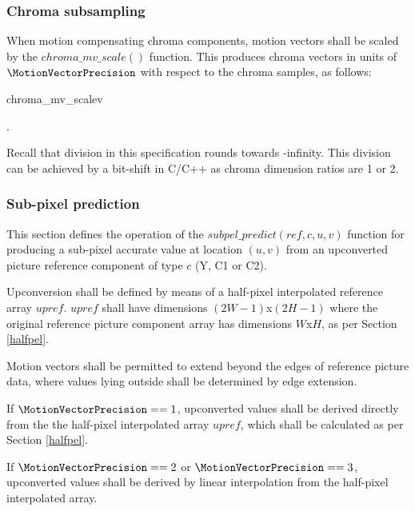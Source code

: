 \subsubsection{Chroma subsampling}
\label{chromamvscale}

When motion compensating chroma components, motion vectors shall be scaled by the
$chroma\_mv\_scale()$ function. This produces chroma vectors in units of 
$\MotionVectorPrecision$ with respect to the chroma samples, as follows:

\begin{pseudo}{chroma\_mv\_scale}{v}
\end{pseudo}.

\begin{informative}
Recall that division in this specification rounds towards -infinity. This division can be achieved by a bit-shift in C/C++ as chroma dimension ratios are 1 or 2.
\end{informative}


\subsubsection{Sub-pixel prediction}
\label{upconvert}

This section defines the operation of the $subpel\_predict(ref, c, u, v)$ function
for producing a sub-pixel accurate value at location $(u,v)$ from an upconverted picture reference component of type $c$ (Y, C1 or C2). 

Upconversion shall be defined by means of a half-pixel interpolated reference array
$upref$.  $upref$ shall have dimensions $(2W-1)$x$(2H-1)$ where the original reference 
picture component array has dimensions $W$x$H$, as per Section \ref{halfpel}. 

Motion vectors shall be permitted to extend beyond the edges of reference picture data,
 where values lying outside shall be determined by edge extension. 

If $\MotionVectorPrecision==1$, upconverted values shall be derived directly from the
the half-pixel interpolated array $upref$, which shall be calculated as per Section \ref{halfpel}.

If $\MotionVectorPrecision==2$ or $\MotionVectorPrecision==3$, upconverted values shall be
derived by linear interpolation from the half-pixel interpolated array.

